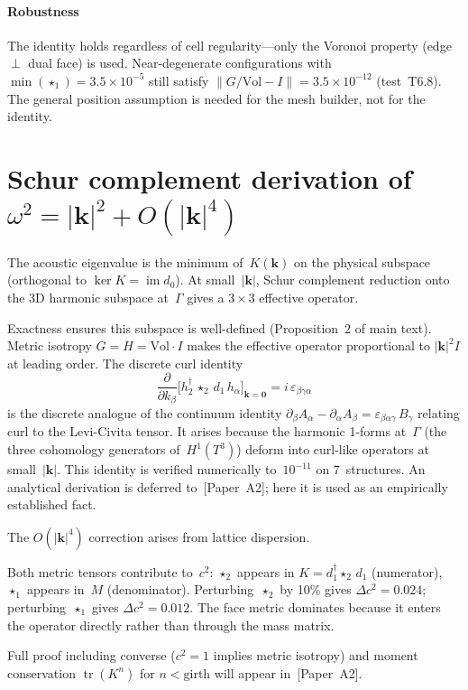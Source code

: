 \documentclass[12pt]{article}
\theoremstyle{remark}
\newcommand{\kk}{\mathbf{k}}
\newcommand{\Vol}{\mathrm{Vol}}
\DeclareMathOperator{\tr}{tr}
\DeclareMathOperator{\im}{im}
\DeclareMathOperator{\cker}{ker}
\begin{document}
\paragraph{Robustness}
The identity holds regardless of cell regularity---only the Voronoi property
(edge~$\perp$ dual face) is used. Near-degenerate configurations with
$\min(\star_1) = 3.5 \times 10^{-5}$ still satisfy
$\|G/\Vol - I\| = 3.5 \times 10^{-12}$ (test~T6.8). The general position
assumption is needed for the mesh builder, not for the identity.

\section{Schur complement derivation of $\omega^2 = |\kk|^2 + O(|\kk|^4)$}
\label{sec:S2}

The acoustic eigenvalue is the minimum of~$K(\kk)$ on the physical subspace
(orthogonal to $\cker K = \im d_0$). At small~$|\kk|$, Schur complement
reduction onto the 3D harmonic subspace at~$\Gamma$ gives a $3 \times 3$
effective operator.

Exactness ensures this subspace is well-defined (Proposition~2 of main text).
Metric isotropy $G = H = \Vol \cdot I$ makes the effective operator
proportional to $|\kk|^2 I$ at leading order. The discrete curl identity
\[
  \frac{\partial}{\partial k_\beta}
  \bigl[h_2^\dagger\,\star_2\,d_1\,h_\alpha\bigr]_{\kk=\mathbf{0}}
  = i\,\varepsilon_{\beta\gamma\alpha}
\]
is the discrete analogue of the continuum identity
$\partial_\beta A_\alpha - \partial_\alpha A_\beta =
\varepsilon_{\beta\alpha\gamma}\,B_\gamma$ relating curl to the Levi-Civita
tensor. It arises because the harmonic 1-forms at~$\Gamma$ (the three
cohomology generators of~$H^1(T^3)$) deform into curl-like operators at
small~$|\kk|$. This identity is verified numerically to~$10^{-11}$ on 7~structures.
An analytical derivation is deferred to~[Paper~A2]; here it is used
as an empirically established fact.

The $O(|\kk|^4)$ correction arises from lattice dispersion.

Both metric tensors contribute to~$c^2$: $\star_2$ appears in
$K = d_1^\dagger \star_2\,d_1$ (numerator), $\star_1$ appears in~$M$
(denominator). Perturbing~$\star_2$ by 10\% gives $\Delta c^2 = 0.024$;
perturbing~$\star_1$ gives $\Delta c^2 = 0.012$. The face metric dominates
because it enters the operator directly rather than through the mass matrix.

Full proof including converse ($c^2 = 1$ implies metric isotropy) and moment
conservation $\tr(K^n)$ for $n < \text{girth}$ will appear in~[Paper~A2].
\end{document}

